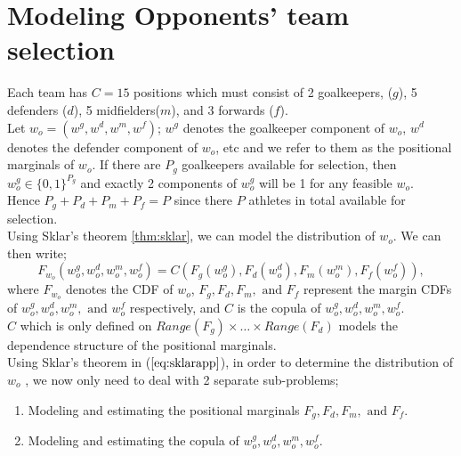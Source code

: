 
		\section{Modeling Opponents' team selection}
			Each team has $C=15$ positions which must consist of 2 goalkeepers, ($g$), 5 defenders ($d$), 5 midfielders($m$), and 3 forwards ($f$).\\

			Let $w_o = (w^g,w^d,w^m,w^f)$; $w^g$ denotes the goalkeeper component of $w_o$, $w^d$ denotes the defender component of $w_o$, etc and we refer to them as the positional marginals of $w_o$. If there are $P_g$ goalkeepers available for selection, then $w_o^g \in \{0,1\}^{P_g}$ and exactly 2 components of $w_o^g$ will be 1 for any feasible $w_o$.\\
			Hence $P_g+P_d+P_m+P_f=P$ since there $P$ athletes in total available for selection.\\
			Using Sklar's theorem \ref{thm:sklar}, we can model the distribution of $w_o$. We can then write;
			\begin{equation}\label{Eq:sklarapp}
				F_{w_o}(w^g_o,w^d_o,w^m_o,w^f_o) = C(F_g(w^g_o),F_d(w^d_o),F_m(w^m_o),F_f(w^f_o)),
			\end{equation}
			where $F_{w_o}$ denotes the CDF of $w_o$, $F_g, F_d, F_m, \text{ and }F_f$ represent the margin CDFs of $w_o^g, w_o^d, w_o^m, \text{ and } w_o^f$ respectively, and $C$ is the copula of $w_o^g,w_o^d,w_o^m,w_o^f$.\\
			$C$ which is only defined on $Range(F_g)\times \dots \times Range(F_d)$ models the dependence structure of the positional marginals.\\
			Using Sklar's theorem in ($\ref{eq:sklarapp}$), in order to determine the distribution of $w_o$ , we now only need to deal with 2 separate sub-problems;
				\begin{enumerate}
					\item[(i).] Modeling and estimating the positional marginals $F_g, F_d, F_m, \text{ and }F_f.$
					\item[(ii).] Modeling and estimating the copula of $w_o^g,w_o^d,w_o^m,w_o^f$.
				\end{enumerate}



